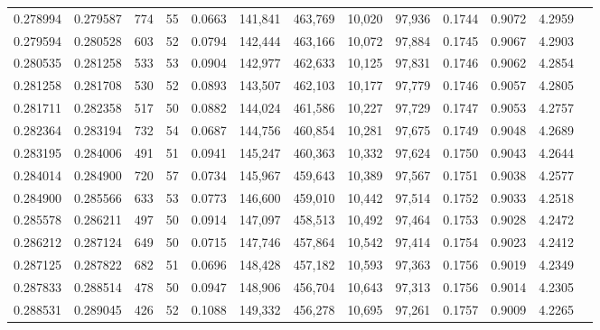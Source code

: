 \begin{tabular}{rrrrrrrrrrrrr}
0.278994 & 0.279587 &   774 &  55 &                                     0.0663 & 141,841 & 463,769 &  10,020 &  97,936 & 0.1744 & 0.9072 & 4.2959 \\
0.279594 & 0.280528 &   603 &  52 &                                     0.0794 & 142,444 & 463,166 &  10,072 &  97,884 & 0.1745 & 0.9067 & 4.2903 \\
0.280535 & 0.281258 &   533 &  53 &                                     0.0904 & 142,977 & 462,633 &  10,125 &  97,831 & 0.1746 & 0.9062 & 4.2854 \\
0.281258 & 0.281708 &   530 &  52 &                                     0.0893 & 143,507 & 462,103 &  10,177 &  97,779 & 0.1746 & 0.9057 & 4.2805 \\
0.281711 & 0.282358 &   517 &  50 &                                     0.0882 & 144,024 & 461,586 &  10,227 &  97,729 & 0.1747 & 0.9053 & 4.2757 \\
0.282364 & 0.283194 &   732 &  54 &                                     0.0687 & 144,756 & 460,854 &  10,281 &  97,675 & 0.1749 & 0.9048 & 4.2689 \\
0.283195 & 0.284006 &   491 &  51 &                                     0.0941 & 145,247 & 460,363 &  10,332 &  97,624 & 0.1750 & 0.9043 & 4.2644 \\
0.284014 & 0.284900 &   720 &  57 &                                     0.0734 & 145,967 & 459,643 &  10,389 &  97,567 & 0.1751 & 0.9038 & 4.2577 \\
0.284900 & 0.285566 &   633 &  53 &                                     0.0773 & 146,600 & 459,010 &  10,442 &  97,514 & 0.1752 & 0.9033 & 4.2518 \\
0.285578 & 0.286211 &   497 &  50 &                                     0.0914 & 147,097 & 458,513 &  10,492 &  97,464 & 0.1753 & 0.9028 & 4.2472 \\
0.286212 & 0.287124 &   649 &  50 &                                     0.0715 & 147,746 & 457,864 &  10,542 &  97,414 & 0.1754 & 0.9023 & 4.2412 \\
0.287125 & 0.287822 &   682 &  51 &                                     0.0696 & 148,428 & 457,182 &  10,593 &  97,363 & 0.1756 & 0.9019 & 4.2349 \\
0.287833 & 0.288514 &   478 &  50 &                                     0.0947 & 148,906 & 456,704 &  10,643 &  97,313 & 0.1756 & 0.9014 & 4.2305 \\
0.288531 & 0.289045 &   426 &  52 &                                     0.1088 & 149,332 & 456,278 &  10,695 &  97,261 & 0.1757 & 0.9009 & 4.2265 \\

\end{tabular}
